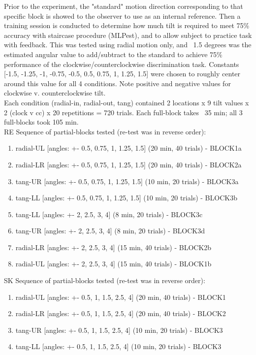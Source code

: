 \documentclass[11pt]{article} %
\begin{document}
Prior to the experiment, the "standard" motion direction corresponding to that specific block is showed to the observer to use as an internal reference. Then a training session is conducted to determine how much tilt is required to meet 75\% accuracy with staircase procedure (MLPest), and to allow subject to practice task with feedback. This was tested using radial motion only, and ~1.5 degrees was the estimated angular value to add/subtract to the standard to achieve 75\% performance of the clockwise/counterclockwise discrimination task. Constants [-1.5, -1.25, -1, -0.75, -0.5, 0.5, 0.75, 1, 1.25, 1.5] were chosen to roughly center around this value for all 4 conditions. Note positive and negative values for clockwise v. counterclockwise tilt.
\\
Each condition (radial-in, radial-out, tang) contained 2 locations x 9 tilt values x 2 (clock v cc) x 20 repetitions = 720 trials. Each full-block takes ~35 min; all 3 full-blocks took 105 min. 
\\
RE Sequence of partial-blocks tested (re-test was in reverse order): 
\begin{enumerate}
\item radial-UL [angles: +- 0.5, 0.75, 1, 1.25, 1.5] (20 min, 40 trials) - BLOCK1a
\item radial-LR [angles: +- 0.5, 0.75, 1, 1.25, 1.5] (20 min, 40 trials) - BLOCK2a
\item tang-UR [angles: +- 0.5, 0.75, 1, 1.25, 1.5] (10 min, 20 trials) - BLOCK3a
\item tang-LL [angles: +- 0.5, 0.75, 1, 1.25, 1.5] (10 min, 20 trials) - BLOCK3b
\item tang-LL [angles: +- 2, 2.5, 3, 4] (8 min, 20 trials) - BLOCK3c
\item tang-UR [angles: +- 2, 2.5, 3, 4] (8 min, 20 trials) - BLOCK3d
\item radial-LR [angles: +- 2, 2.5, 3, 4] (15 min, 40 trials) - BLOCK2b
\item radial-UL [angles: +- 2, 2.5, 3, 4] (15 min, 40 trials) - BLOCK1b
\end{enumerate}
SK Sequence of partial-blocks tested (re-test was in reverse order): 
\begin{enumerate}
\item radial-UL [angles: +- 0.5, 1, 1.5, 2.5, 4] (20 min, 40 trials) - BLOCK1
\item radial-LR [angles: +- 0.5, 1, 1.5, 2.5, 4] (20 min, 40 trials) - BLOCK2
\item tang-UR [angles: +- 0.5, 1, 1.5, 2.5, 4] (10 min, 20 trials) - BLOCK3
\item tang-LL [angles: +- 0.5, 1, 1.5, 2.5, 4] (10 min, 20 trials) - BLOCK3
\end{enumerate}
\end{document}

